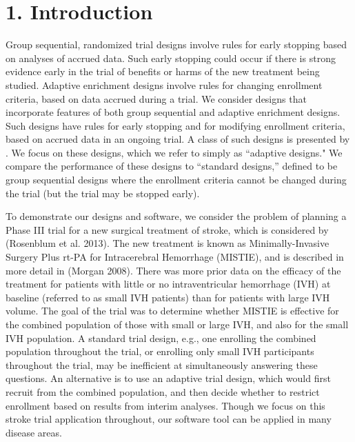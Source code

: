 \documentclass{article}
\begin{document}
\section*{1. Introduction}
Group sequential, randomized trial designs involve  rules for early stopping based on analyses of accrued data. Such early stopping could occur if there is strong evidence early in the trial of benefits or harms of the new treatment being studied. Adaptive enrichment designs involve rules for changing enrollment criteria, based on data accrued during a trial. We consider designs that incorporate features of both group sequential and adaptive enrichment designs. Such designs have rules for early stopping and for modifying enrollment criteria, based on accrued data in an ongoing trial. A class of such designs is presented by \cite{Rosenblum2013AdaptMISTIE}. We focus on these designs, which
we refer to simply as ``adaptive designs." We compare the performance of these designs to ``standard designs,'' defined to  be group sequential designs where the enrollment criteria cannot be changed during the trial (but the trial may be stopped early).

To demonstrate our designs and software, we consider the problem of 
 planning a Phase III trial for a new surgical treatment of stroke, which is considered by (Rosenblum et al. 2013)\cite{Rosenblum2013AdaptMISTIE}.
The new treatment is known as Minimally-Invasive Surgery Plus rt-PA for Intracerebral Hemorrhage (MISTIE), and is described in more detail in (Morgan 2008)\cite{MISTIE_prelim2008}. There was more prior data on the efficacy of the treatment for patients with little or no intraventricular hemorrhage (IVH) at baseline (referred to as small IVH patients) than for patients with large IVH volume. The goal of the trial was to determine whether MISTIE is effective for the combined population of those with small or large IVH, and also for the small IVH population. A standard trial design, e.g., one enrolling the combined population throughout the trial, or enrolling only small IVH participants throughout the trial, may be inefficient at simultaneously answering these questions.
An alternative is to use an adaptive trial design, which would first recruit from the combined population, and then decide whether to restrict enrollment based on results from interim  analyses. %
Though we focus on this stroke trial application throughout, our software tool can be applied in many disease areas.
\end{document}
